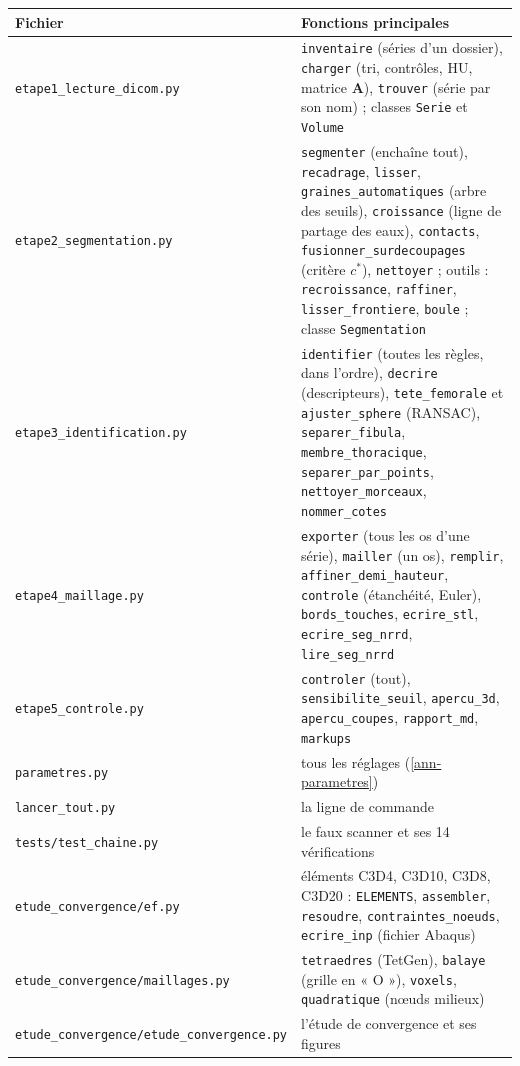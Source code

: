 \documentclass[11pt,a4paper]{article}
\newcommand{\fichier}[1]{\texttt{\small #1}}
\newcommand{\vb}[1]{\mathbf{#1}}
\begin{document}
\begin{longtable}{p{4.2cm}p{11cm}}
\toprule
\textbf{Fichier} & \textbf{Fonctions principales} \\
\midrule
\endhead
\fichier{etape1\_lecture\_dicom.py} & \texttt{inventaire} (séries d'un dossier), \texttt{charger} (tri, contrôles, HU,
matrice $\vb{A}$), \texttt{trouver} (série par son nom) ; classes \texttt{Serie} et \texttt{Volume} \\
\fichier{etape2\_segmentation.py} & \texttt{segmenter} (enchaîne tout), \texttt{recadrage}, \texttt{lisser},
\texttt{graines\_automatiques} (arbre des seuils), \texttt{croissance} (ligne de partage des eaux),
\texttt{contacts}, \texttt{fusionner\_surdecoupages} (critère $c^*$), \texttt{nettoyer} ; outils :
\texttt{recroissance}, \texttt{raffiner}, \texttt{lisser\_frontiere}, \texttt{boule} ; classe \texttt{Segmentation} \\
\fichier{etape3\_identification.py} & \texttt{identifier} (toutes les règles, dans l'ordre), \texttt{decrire}
(descripteurs), \texttt{tete\_femorale} et \texttt{ajuster\_sphere} (RANSAC), \texttt{separer\_fibula},
\texttt{membre\_thoracique}, \texttt{separer\_par\_points}, \texttt{nettoyer\_morceaux}, \texttt{nommer\_cotes} \\
\fichier{etape4\_maillage.py} & \texttt{exporter} (tous les os d'une série), \texttt{mailler} (un os),
\texttt{remplir}, \texttt{affiner\_demi\_hauteur}, \texttt{controle} (étanchéité, Euler), \texttt{bords\_touches},
\texttt{ecrire\_stl}, \texttt{ecrire\_seg\_nrrd}, \texttt{lire\_seg\_nrrd} \\
\fichier{etape5\_controle.py} & \texttt{controler} (tout), \texttt{sensibilite\_seuil}, \texttt{apercu\_3d},
\texttt{apercu\_coupes}, \texttt{rapport\_md}, \texttt{markups} \\
\fichier{parametres.py} & tous les réglages (\cref{ann-parametres}) \\
\fichier{lancer\_tout.py} & la ligne de commande \\
\fichier{tests/test\_chaine.py} & le faux scanner et ses 14 vérifications \\
\fichier{etude\_convergence/ef.py} & éléments C3D4, C3D10, C3D8, C3D20 : \texttt{ELEMENTS}, \texttt{assembler},
\texttt{resoudre}, \texttt{contraintes\_noeuds}, \texttt{ecrire\_inp} (fichier Abaqus) \\
\fichier{etude\_convergence/maillages.py} & \texttt{tetraedres} (TetGen), \texttt{balaye} (grille en « O »),
\texttt{voxels}, \texttt{quadratique} (nœuds milieux) \\
\fichier{etude\_convergence/etude\_convergence.py} & l'étude de convergence et ses figures \\
\bottomrule
\end{longtable}
\end{document}
